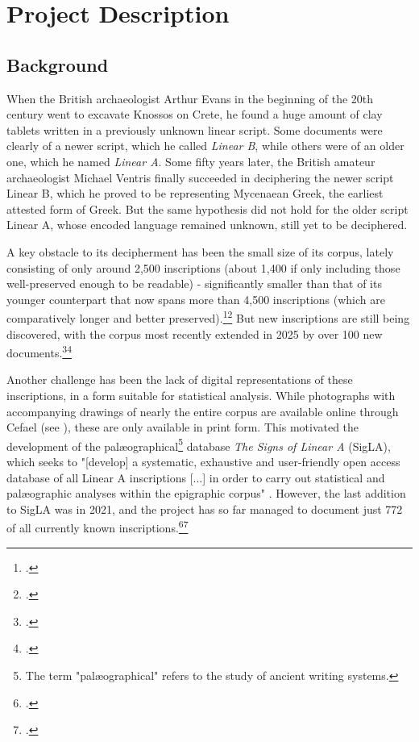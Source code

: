 

\chapter{Project Description}

\section{Background}

When the British archaeologist Arthur Evans in the beginning of the 20th century went to excavate Knossos on Crete, he found a huge amount of clay tablets written in a previously unknown linear script.
Some documents were clearly of a newer script, which he called \textit{Linear B}, while others were of an older one, which he named \textit{Linear A}.
Some fifty years later, the British amateur archaeologist Michael Ventris finally succeeded in deciphering the newer script Linear B, which he proved to be representing Mycenaean Greek, the earliest attested form of Greek.
But the same hypothesis did not hold for the older script Linear A, whose encoded language remained unknown, still yet to be deciphered.

A key obstacle to its decipherment has been the small size of its corpus, lately consisting of only around 2,500 inscriptions (about 1,400 if only including those well-preserved enough to be readable) - significantly smaller than that of its younger counterpart that now spans more than 4,500 inscriptions (which are comparatively longer and better preserved).\footcite{Salgarella2020}\footcite[p.~13,46]{Salgarella2025} 
But new inscriptions are still being discovered, with the corpus most recently extended in 2025 by over 100 new documents.\footcite{RILA-S1}\footcite{CNRLinearACorpus2025}

Another challenge has been the lack of digital representations of these inscriptions, in a form suitable for statistical analysis.
While photographs with accompanying drawings of nearly the entire corpus are available online through \acf{Cefael} (see \textcite{EtudesCretoises21}), these are only available in print form.
This motivated the development of the palæographical\footnote{The term "palæographical" refers to the study of ancient writing systems.} database \textit{The Signs of Linear A} (SigLA), which seeks to "[develop] a systematic, exhaustive and user-friendly open access database of all Linear A inscriptions [...] in order to carry out statistical and palæographic analyses within the epigraphic corpus" \parencite{SalgarellaCastellanSigLA2020}.
However, the last addition to SigLA was in 2021, and the project has so far managed to document just 772 of all currently known inscriptions.\footcite{SigLAAboutPage}\footcite{SigLASearchDocuments}

